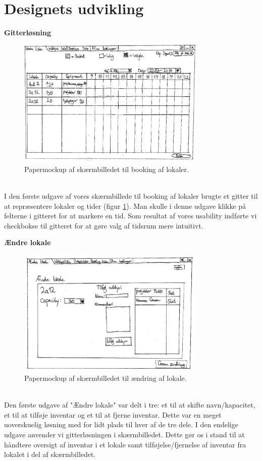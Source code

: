 \section{Designets udvikling}
\label{Design_G_du}
\textbf{Gitterløsning}
\begin{figure}[h!]
  \centering
    \includegraphics[width=0.8\textwidth]{Appendix/GUI-Prototype/PaperMockup/LokaleListe_001}
  \caption{Papermockup af skærmbilledet til booking af lokaler.}
\label{Design_G_Development_LokaleListe_pm}
\end{figure} 
\\I den første udgave af vores skærmbillede til booking af lokaler brugte et gitter til at repræsentere lokaler og tider (figur \ref{Design_G_Development_LokaleListe_pm}). Man skulle i denne udgave klikke på felterne i gitteret for at markere en tid. Som resultat af vores usability indførte vi checkbokse til gitteret for at gøre valg af tidsrum mere intuitivt.

\textbf{Ændre lokale}
\begin{figure}[h!]
  \centering
    \includegraphics[width=0.8\textwidth]{Appendix/GUI-Prototype/PaperMockup/AendreLokale_001}
  \caption{Papermockup af skærmbilledet til ændring af lokale.}
\label{Design_G_Development_AendreLokale_Final}
\end{figure} 
\\Den første udgave af "Ændre lokale" var delt i tre: et til at skifte navn/kapacitet, et til at tilføje inventar og et til at fjerne inventar. Dette var en meget uoverskuelig løsning med for lidt plads til hver af de tre dele. I den endelige udgave anvender vi gitterløsningen i skærmbilledet. Dette gør os i stand til at håndtere oversigt af inventar i et lokale samt tilføjelse/fjernelse af inventar fra lokalet i del af skærmbilledet.

